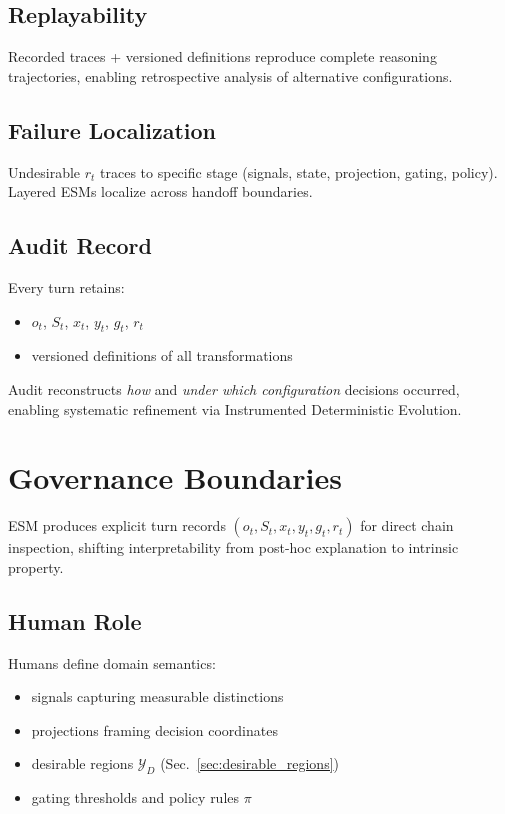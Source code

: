 \documentclass[11pt]{article}
\begin{document}
\subsection{Replayability}
Recorded traces + versioned definitions reproduce complete reasoning trajectories, enabling retrospective analysis of alternative configurations.

\subsection{Failure Localization}
Undesirable $r_t$ traces to specific stage (signals, state, projection, gating, policy). Layered ESMs localize across handoff boundaries.

\subsection{Audit Record}
Every turn retains:
\begin{itemize}
\item $o_t$, $S_t$, $x_t$, $y_t$, $g_t$, $r_t$
\item versioned definitions of all transformations
\end{itemize}

Audit reconstructs \emph{how} and \emph{under which configuration} decisions occurred, enabling systematic refinement via Instrumented Deterministic Evolution.




\section{Governance Boundaries}

ESM produces explicit turn records $(o_t, S_t, x_t, y_t, g_t, r_t)$ for direct chain inspection, shifting interpretability from post-hoc explanation to intrinsic property.

\subsection{Human Role}
Humans define domain semantics:
\begin{itemize}
\item signals capturing measurable distinctions
\item projections framing decision coordinates  
\item desirable regions $\mathcal{Y}_D$ (Sec.~\ref{sec:desirable_regions})
\item gating thresholds and policy rules $\pi$
\end{itemize}
\end{document}
